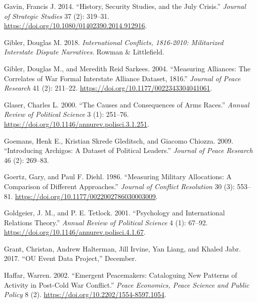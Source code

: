 \documentclass{article}
\newlength{\cslhangindent}
\newlength{\cslentryspacingunit} %
\newenvironment{CSLReferences}[2] %
 {%
  \setlength{\parindent}{0pt}
  \ifodd #1
  \let\oldpar\par
  \def\par{\hangindent=\cslhangindent\oldpar}
  \fi
  \setlength{\parskip}{#2\cslentryspacingunit}
 }%
 {}
\begin{document}
\begin{CSLReferences}{1}{0}
\leavevmode{}%
Gavin, Francis J. 2014. {``History, {Security Studies}, and the {July
Crisis}.''} \emph{Journal of Strategic Studies} 37 (2): 319--31.
\url{https://doi.org/10.1080/01402390.2014.912916}.

\leavevmode{}%
Gibler, Douglas M. 2018. \emph{International {Conflicts}, 1816-2010:
{Militarized Interstate Dispute Narratives}}. {Rowman \& Littlefield}.

\leavevmode{}%
Gibler, Douglas M., and Meredith Reid Sarkees. 2004. {``Measuring
{Alliances}: The {Correlates} of {War Formal Interstate Alliance}
{Dataset}, 1816.''} \emph{Journal of Peace Research} 41
(2): 211--22. \url{https://doi.org/10.1177/0022343304041061}.

\leavevmode{}%
Glaser, Charles L. 2000. {``The {Causes} and {Consequences} of {Arms
Races}.''} \emph{Annual Review of Political Science} 3 (1): 251--76.
\url{https://doi.org/10.1146/annurev.polisci.3.1.251}.

\leavevmode{}%
Goemans, Henk E., Kristian Skrede Gleditsch, and Giacomo Chiozza. 2009.
{``Introducing {Archigos}: {A} Dataset of Political Leaders.''}
\emph{Journal of Peace Research} 46 (2): 269--83.

\leavevmode{}%
Goertz, Gary, and Paul F. Diehl. 1986. {``Measuring {Military
Allocations}: {A Comparison} of {Different Approaches}.''} \emph{Journal
of Conflict Resolution} 30 (3): 553--81.
\url{https://doi.org/10.1177/0022002786030003009}.

\leavevmode{}%
Goldgeier, J. M., and P. E. Tetlock. 2001. {``Psychology and
{International Relations Theory}.''} \emph{Annual Review of Political
Science} 4 (1): 67--92.
\url{https://doi.org/10.1146/annurev.polisci.4.1.67}.

\leavevmode{}%
Grant, Christan, Andrew Halterman, Jill Irvine, Yan Liang, and Khaled
Jabr. 2017. {``{OU Event Data Project},''} December.

\leavevmode{}%
Haffar, Warren. 2002. {``Emergent {Peacemakers}: {Cataloguing New
Patterns} of {Activity} in {Post-Cold War Conflict}.''} \emph{Peace
Economics, Peace Science and Public Policy} 8 (2).
\url{https://doi.org/10.2202/1554-8597.1054}.


\end{CSLReferences}
\end{document}
